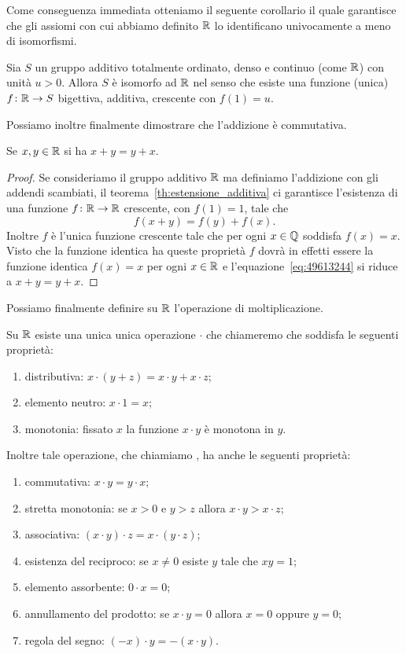 Come conseguenza immediata otteniamo il seguente corollario il quale
garantisce che gli assiomi con cui abbiamo definito $\RR$
lo identificano univocamente a meno di isomorfismi.

\begin{corollary}[unicità di $\RR$]%
  \label{th:unicitaR}%
  Sia $S$ un gruppo additivo totalmente ordinato, denso e continuo (come $\RR$)
  con unità $u>0$.  
  Allora $S$ è isomorfo ad $\RR$ nel senso che esiste una funzione (unica)
  $f\colon \mathbb R\to S$ bigettiva, additiva, crescente con $f(1)=u$.
\end{corollary}

Possiamo inoltre finalmente dimostrare che l'addizione è commutativa.
\begin{theorem}
  Se $x,y\in \mathbb R$ si ha $x+y=y+x$.
\end{theorem}
%
\begin{proof}
Se consideriamo il gruppo additivo $\RR$ ma definiamo 
l'addizione con gli addendi scambiati, il teorema~\ref{th:estensione_additiva}
ci garantisce l'esistenza di 
una funzione $f\colon \mathbb R\to \mathbb R$ crescente, con $f(1)=1$, tale che 
\begin{equation}\label{eq:49613244}
  f(x+y) = f(y)+f(x).
\end{equation}
Inoltre $f$ è l'unica funzione crescente tale che 
per ogni $x\in \mathbb Q$ soddisfa $f(x)=x$. 
Visto che la funzione identica ha queste proprietà 
$f$ dovrà in effetti essere la funzione identica $f(x)=x$ 
per ogni $x\in \mathbb R$ 
e l'equazione~\eqref{eq:49613244} si riduce a $x+y=y+x$.
\end{proof}
%
Possiamo finalmente definire su $\RR$ l'operazione di moltiplicazione.
%
\begin{theorem}[moltiplicazione]
Su $\RR$ esiste una unica unica operazione $\cdot$ che chiameremo 
 che soddisfa le seguenti 
proprietà: 
\begin{enumerate}
  \item distributiva: $x\cdot(y+z) = x\cdot y + x\cdot z$;
  \item elemento neutro: $x\cdot 1 = x$;
  \item monotonia: fissato $x$ la funzione $x\cdot y$ è monotona in $y$.  
\end{enumerate}
  Inoltre tale operazione, che chiamiamo ,
  ha anche le seguenti proprietà:
\begin{enumerate}
  \item commutativa: $x\cdot y = y\cdot x$;
  \item stretta monotonia: se $x>0$ e $y>z$ allora $x\cdot y > x \cdot z$;
  \item associativa: $(x\cdot y)\cdot z = x \cdot (y\cdot z)$;
  \item esistenza del reciproco: se $x\neq 0$ esiste $y$ tale 
  che $xy = 1$;
  \item elemento assorbente: $0\cdot x = 0$;
  \item annullamento del prodotto: se $x\cdot y=0$ allora $x=0$ oppure $y=0$;
  \item regola del segno: $(-x)\cdot y = -(x\cdot y)$.
\end{enumerate}
\end{theorem}
